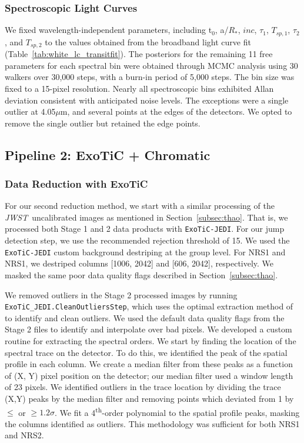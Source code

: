 \documentclass[twocolumn]{aastex63} %
\newcommand{\um}{$\mu$m}
\newcommand{\jwst}{\textit{JWST}}
\begin{document}
\subsubsection{Spectroscopic Light Curves}

We fixed wavelength-independent parameters, including t$_{0}$, a/$R_{*}$, $inc$, $\tau_{1}$, $T_{sp,1}$, $\tau_{2}$, and $T_{sp,2}$ to the values obtained from the broadband light curve fit (Table~\ref{tab:white_lc_transitfit}). The posteriors for the remaining 11 free parameters for each spectral bin were obtained through MCMC analysis using 30 walkers over 30,000 steps, with a burn-in period of 5,000 steps. The bin size was fixed to a 15-pixel resolution. Nearly all spectroscopic bins exhibited Allan deviation consistent with anticipated noise levels. The exceptions were a single outlier at 4.05\um, and several points at the edges of the detectors. We opted to remove the single outlier but retained the edge points. 

\subsection{Pipeline 2: ExoTiC + Chromatic}\label{subsec:feinstein}

\subsubsection{Data Reduction with ExoTiC}

For our second reduction method, we start with a similar processing of the \jwst\ uncalibrated images as mentioned in Section~\ref{subsec:thao}. That is, we processed both Stage 1 and 2 data products with \texttt{ExoTiC-JEDI}. For our jump detection step, we use the recommended rejection threshold of 15. We used the \texttt{ExoTiC-JEDI} custom background destriping at the group level. For NRS1 and NRS1, we destriped columns [1006, 2042] and [606, 2042], respectively. We masked the same poor data quality flags described in Section~\ref{subsec:thao}.

We removed outliers in the Stage 2 processed images by running \texttt{ExoTiC\_JEDI.CleanOutliersStep}, which uses the optimal extraction method of \cite{horne86} to identify and clean outliers. We used the default data quality flags from the Stage 2 files to identify and interpolate over bad pixels. We developed a custom routine for extracting the spectral orders. We start by finding the location of the spectral trace on the detector. To do this, we identified the peak of the spatial profile in each column. We create a median filter from these peaks as a function of (X, Y) pixel position on the detector; our median filter used a window length of 23 pixels. We identified outliers in the trace location by dividing the trace (X,Y) peaks by the median filter and removing points which deviated from 1 by  $\leq$ or $\geq1.2 \sigma$. We fit a 4\textsuperscript{th}-order polynomial to the spatial profile peaks, masking the columns identified as outliers. This methodology was sufficient for both NRS1 and NRS2.
\end{document}
